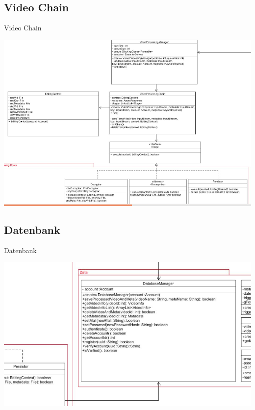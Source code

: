 \documentclass[19pt]{beamer}
\begin{document}
\subsection{Video Chain}
\begin{frame}{Video Chain}
\begin{center}
\includegraphics[scale=0.3]{resources/service_vidchain.png}
\end{center}
\end{frame}
\subsection{Datenbank}
\begin{frame}{Datenbank}
\begin{center}
\includegraphics[scale=0.35]{resources/service_db.png}
\end{center}
\end{frame}

\end{document}
